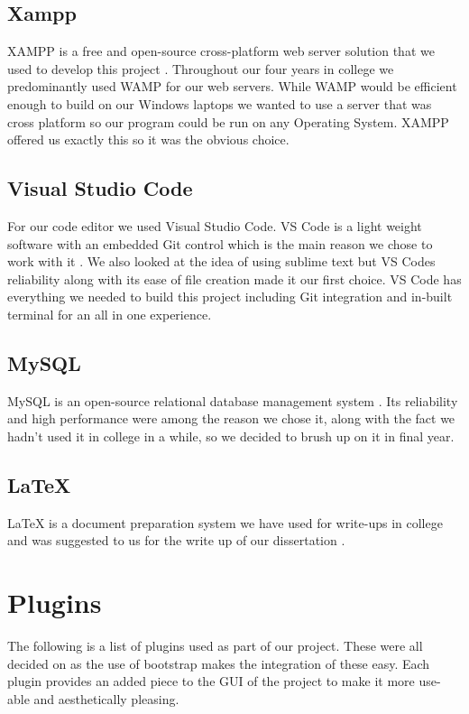 \subsection{Xampp}

XAMPP is a free and open-source cross-platform web server solution that we used to develop this project \cite{XAMP}. Throughout our four years in college we predominantly used WAMP for our web servers. While WAMP would be efficient enough to build on our Windows laptops we wanted to use a server that was cross platform so our program could be run on any Operating System. XAMPP offered us exactly this so it was the obvious choice.

\subsection{Visual Studio Code}

For our code editor we used Visual Studio Code. VS Code is a light weight software with an embedded Git control which is the main reason we chose to work with it \cite{VSC}. We also looked at the idea of using sublime text but VS Codes reliability along with its ease of file creation made it our first choice. VS Code has everything we needed to build this project including Git integration and in-built terminal for an all in one experience.

\subsection{MySQL}

MySQL is an open-source relational database management system \cite{SQL}. Its reliability and high performance were among the reason we chose it, along with the fact we hadn’t used it in college in a while, so we decided to brush up on it in final year.

\subsection{LaTeX}

LaTeX is a document preparation system we have used for write-ups in college and was suggested to us for the write up of our dissertation \cite{LTX}.

\section{Plugins}

The following is a list of plugins used as part of our project. These were all decided on as the use of bootstrap makes the integration of these easy. Each plugin provides an added piece to the GUI of the project to make it more use-able and aesthetically pleasing.


